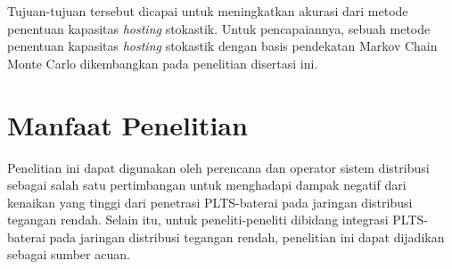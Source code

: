 Tujuan-tujuan tersebut dicapai untuk meningkatkan akurasi dari metode penentuan kapasitas \textit{hosting} stokastik. Untuk pencapaiannya, sebuah metode penentuan kapasitas \textit{hosting} stokastik dengan basis pendekatan Markov Chain Monte Carlo dikembangkan pada penelitian disertasi ini.



\section{Manfaat Penelitian}
Penelitian ini dapat digunakan oleh perencana dan operator sistem distribusi sebagai salah satu pertimbangan untuk menghadapi dampak negatif dari kenaikan yang tinggi dari penetrasi PLTS-baterai pada jaringan distribusi tegangan rendah. Selain itu, untuk peneliti-peneliti dibidang integrasi PLTS-baterai pada jaringan distribusi tegangan rendah, penelitian ini dapat dijadikan sebagai sumber acuan. 



